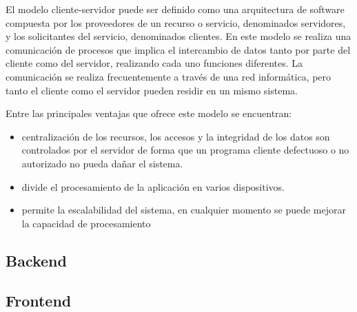 El modelo cliente-servidor puede ser definido como una arquitectura
de software compuesta por los proveedores de un recurso o servicio, 
denominados servidores, y los solicitantes del servicio, denominados
clientes. En este modelo se realiza una comunicación de procesos
que implica el intercambio de datos tanto por parte del cliente 
como del servidor, realizando cada uno funciones diferentes. La comunicación
se realiza frecuentemente a través de una red informática, pero 
tanto el cliente como el servidor pueden residir en un mismo sistema.

Entre las principales ventajas que ofrece este modelo se encuentran:

\begin{itemize}
    \item centralización de los recursos, los accesos y la integridad de los datos son controlados por el servidor de forma que un programa cliente defectuoso o no autorizado no pueda dañar el sistema.
    \item divide el procesamiento de la aplicación en varios dispositivos.
    \item permite la escalabilidad del sistema, en cualquier momento se puede mejorar la capacidad de procesamiento
\end{itemize}
 


\subsection{Backend}
\subsection{Frontend}